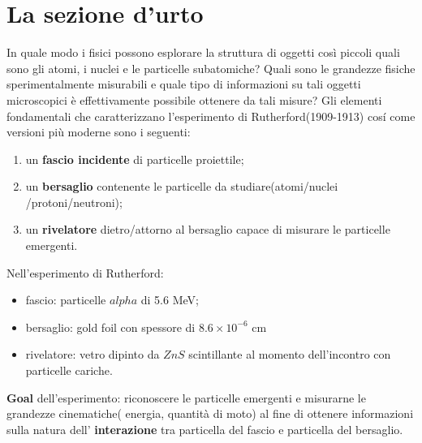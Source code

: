 \section{La sezione d'urto}\label{sec:sezione-d'urto}
In quale modo i fisici possono esplorare la struttura di oggetti così
piccoli quali sono gli atomi, i nuclei e le particelle subatomiche?
Quali sono le grandezze fisiche sperimentalmente misurabili e quale tipo
di informazioni su tali oggetti microscopici è effettivamente possibile
ottenere da tali misure?
Gli elementi fondamentali che caratterizzano l'esperimento di
Rutherford(1909-1913) cosí come versioni più moderne sono i seguenti:

\begin{enumerate}
	\item
	un \textbf{fascio incidente} di particelle proiettile;
	\item
	un \textbf{bersaglio} contenente le particelle da
	studiare(atomi/nuclei /protoni/neutroni);
	\item
	un \textbf{rivelatore} dietro/attorno al bersaglio capace di misurare
	le particelle emergenti.
\end{enumerate}

Nell'esperimento di Rutherford:

\begin{itemize}
	\tightlist
	\item fascio: particelle $alpha$ di 5.6 MeV;
	\item bersaglio: gold foil con spessore di \(8.6 \times 10^{-6}\) cm
	\item rivelatore: vetro dipinto da \(ZnS\) scintillante al momento
	dell'incontro con particelle cariche.
\end{itemize}

\textbf{Goal} dell'esperimento: riconoscere le particelle emergenti e
misurarne le grandezze cinematiche( energia, quantità di moto) al fine di
ottenere informazioni sulla natura dell' \textbf{interazione} tra
particella del fascio e particella del bersaglio.

